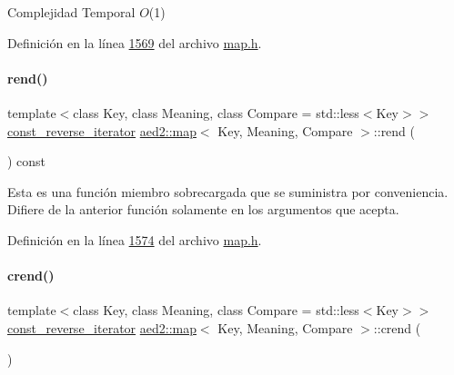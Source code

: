 \begin{DoxyDescription}
\item[Complejidad Temporal]$O$(1)
\end{DoxyDescription}

Definición en la línea \hyperlink{map_8h_source_l01569}{1569} del archivo \hyperlink{map_8h_source}{map.\+h}.

\mbox{\label{classaed2_1_1map_a7cf14a4b505505d0f074034b7399fb24_a7cf14a4b505505d0f074034b7399fb24}} 
\paragraph{\texorpdfstring{rend()}{rend()}\hspace{0.1cm}{\footnotesize\ttfamily [2/2]}}
{\footnotesize\ttfamily template$<$class Key, class Meaning, class Compare = std\+::less$<$\+Key$>$$>$ \\
\hyperlink{classaed2_1_1map_aed66a216549d13078a3ea6978ea0b768_aed66a216549d13078a3ea6978ea0b768}{const\+\_\+reverse\+\_\+iterator} \hyperlink{classaed2_1_1map}{aed2\+::map}$<$ Key, Meaning, Compare $>$\+::rend (\begin{DoxyParamCaption}{ }\end{DoxyParamCaption}) const\hspace{0.3cm}{\ttfamily [inline]}}

Esta es una función miembro sobrecargada que se suministra por conveniencia. Difiere de la anterior función solamente en los argumentos que acepta. 

Definición en la línea \hyperlink{map_8h_source_l01574}{1574} del archivo \hyperlink{map_8h_source}{map.\+h}.

\mbox{\label{classaed2_1_1map_a40933b2efe1cb479de9195ea947244d1_a40933b2efe1cb479de9195ea947244d1}} 
\paragraph{\texorpdfstring{crend()}{crend()}}
{\footnotesize\ttfamily template$<$class Key, class Meaning, class Compare = std\+::less$<$\+Key$>$$>$ \\
\hyperlink{classaed2_1_1map_aed66a216549d13078a3ea6978ea0b768_aed66a216549d13078a3ea6978ea0b768}{const\+\_\+reverse\+\_\+iterator} \hyperlink{classaed2_1_1map}{aed2\+::map}$<$ Key, Meaning, Compare $>$\+::crend (\begin{DoxyParamCaption}{ }\end{DoxyParamCaption})\hspace{0.3cm}{\ttfamily [inline]}}

